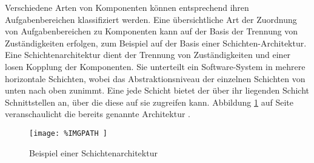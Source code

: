 Verschiedene Arten von Komponenten können entsprechend ihren Aufgabenbereichen klassifiziert werden. Eine übersichtliche Art der Zuordnung von Aufgabenbereichen zu Komponenten kann auf der Basis der Trennung von Zuständigkeiten erfolgen, zum Beispiel auf der Basis einer Schichten-Architektur. Eine Schichtenarchitektur dient der Trennung von Zuständigkeiten und einer losen Kopplung der Komponenten. Sie unterteilt ein Software-System in mehrere horizontale Schichten, wobei das Abstraktionsniveau der einzelnen Schichten von unten nach oben zunimmt. Eine jede Schicht bietet der über ihr liegenden Schicht Schnittstellen an, über die diese auf sie zugreifen kann. Abbildung \ref{fig:2_Schichtenarchitektur} auf Seite \pageref{fig:2_Schichtenarchitektur} veranschaulicht die bereits genannte Architektur \citereset \autocite{Andresen.2003}.
 \begin{figure}[h]
  \centering
  \texttt{[image: 
    \%IMGPATH
  ]}
  \caption[
    Beispiel einer Schichtenarchitektur
  ]{
    Beispiel einer Schichtenarchitektur
  }
  \label{fig:2_Schichtenarchitektur}
\end{figure}

